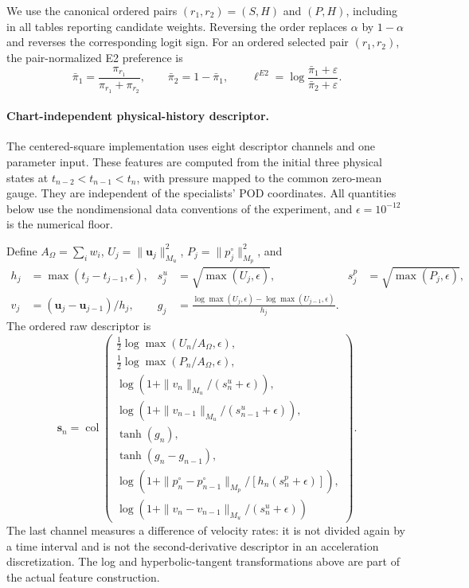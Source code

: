 We use the canonical ordered pairs $(r_1,r_2)=(S,H)$ and $(P,H)$, including in all tables reporting candidate weights. Reversing the order replaces $\alpha$ by $1-\alpha$ and reverses the corresponding logit sign. For an ordered selected pair $(r_1,r_2)$, the pair-normalized E2
preference is
\begin{equation}
  \bar\pi_1
  =
  \frac{\pi_{r_1}}
       {\pi_{r_1}+\pi_{r_2}},
  \qquad
  \bar\pi_2
  =
  1-\bar\pi_1,
  \qquad
  \ell^{E2}
  =
  \log
  \frac{\bar\pi_1+\varepsilon}
       {\bar\pi_2+\varepsilon}.
  \label{eq:app_pair_logit}
\end{equation}


\paragraph{Chart-independent physical-history descriptor.}
The centered-square implementation uses eight descriptor channels and one parameter input. These features are computed from the initial three physical states at $t_{n-2}<t_{n-1}<t_n$, with pressure mapped to the common zero-mean gauge. They are independent of the specialists' POD coordinates. All quantities below use the nondimensional data conventions of the experiment, and $\epsilon=10^{-12}$ is the numerical floor.

Define $A_\Omega=\sum_i w_i$, $U_j=\|\bm u_j\|_{M_u}^2$, $P_j=\|p_j^\circ\|_{M_p}^2$, and
\begin{align}
 h_j&=\max(t_j-t_{j-1},\epsilon),&
 s_j^u&=\sqrt{\max(U_j,\epsilon)},&
 s_j^p&=\sqrt{\max(P_j,\epsilon)},\\
 v_j&=(\bm u_j-\bm u_{j-1})/h_j,&
 g_j&=\frac{\log\max(U_j,\epsilon)-\log\max(U_{j-1},\epsilon)}{h_j}.
\end{align}
The ordered raw descriptor is
\begin{equation}
\bm s_n=\operatorname{col}\left(
\begin{array}{l}
 \tfrac12\log\max(U_n/A_\Omega,\epsilon),\\
 \tfrac12\log\max(P_n/A_\Omega,\epsilon),\\
 \log(1+\|v_n\|_{M_u}/(s_n^u+\epsilon)),\\
 \log(1+\|v_{n-1}\|_{M_u}/(s_{n-1}^u+\epsilon)),\\
 \tanh(g_n),\\
 \tanh(g_n-g_{n-1}),\\
 \log(1+\|p_n^\circ-p_{n-1}^\circ\|_{M_p}/[h_n(s_n^p+\epsilon)]),\\
 \log(1+\|v_n-v_{n-1}\|_{M_u}/(s_n^u+\epsilon))
\end{array}\right).
\label{eq:app_t2c_descriptor}
\end{equation}
The last channel measures a difference of velocity rates: it is not divided again by a time interval and is not the second-derivative descriptor in an acceleration discretization. The log and hyperbolic-tangent transformations above are part of the actual feature construction.

